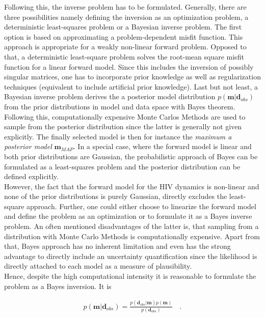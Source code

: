 Following this, the inverse problem has to be formulated.
Generally, there are three possibilities namely defining the inversion as an optimization problem, a deterministic least-squares problem or a Bayesian inverse problem.
The first option is based on approximating a problem-dependent misfit function. This approach is appropriate for a weakly non-linear forward problem.
Opposed to that, a deterministic least-square problem solves the root-mean square misfit function for a linear forward model.
Since this includes the inversion of possibly singular matrices, one has to incorporate prior knowledge as well as regularization techniques (equivalent to include artificial prior knowledge). 
Last but not least, a Bayesian inverse problem derives the a posterior model distribution $p(\mathbf{m}|\mathbf{d}_{obs})$ from the prior distributions in model and data space with Bayes theorem.
Following this, computationally expensive Monte Carlos Methods are used to sample from the posterior distribution since the latter is generally not given explicitly.
The finally selected model is then for instance the \textit{maximum a posterior model} $\mathbf{m}_{MAP}$.
In a special case, where the forward model is linear and both prior distributions are Gaussian, the probabilistic approach of Bayes can be formulated as a least-squares problem and the posterior distribution can be defined explicitly.\\
However, the fact that the forward model for the HIV dynamics is non-linear and none of the prior distributions is purely Gaussian, directly excludes the least-square approach.
Further, one could either choose to linearize the forward model and define the problem as an optimization or to formulate it as a Bayes inverse problem.
An often mentioned disadvantages of the latter is, that sampling from a distribution with Monte Carlo Methods is computationally expensive.
Apart from that, Bayes approach has no inherent limitation and even has the strong advantage to directly include an uncertainty quantification since the likelihood is directly attached to each model as a measure of plausibility.\\
Hence, despite the high computational intensity it is reasonable to formulate the problem as a Bayes inversion.
It is 

\begin{align}
    p(\mathbf{m}|\mathbf{d}_{obs}) = \frac{p(\mathbf{d}_{obs}|\mathbf{m})p(\mathbf{m})}{p(\mathbf{d}_{obs})} \quad .
\end{align}


